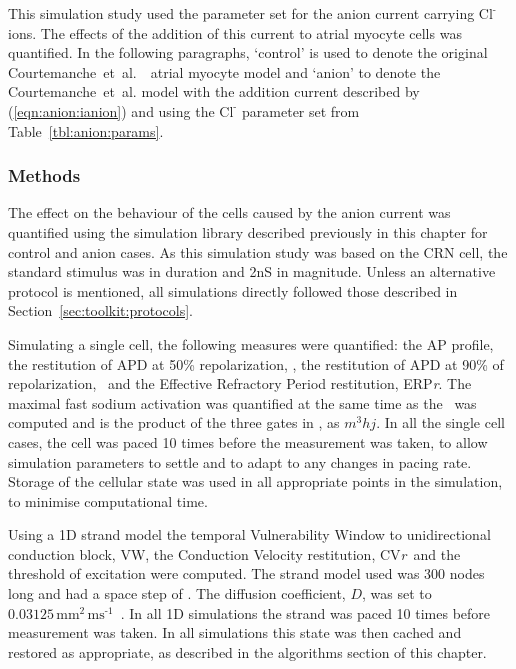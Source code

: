 This simulation study used the parameter set for the anion current carrying
$\text{Cl}^{\text{-}}$ ions.
The effects of the addition of this current to atrial myocyte cells was
quantified.
In the following paragraphs, `control' is used to denote the original
Courtemanche~et~al.~\cite{CRN98}\ atrial myocyte model and `anion' to denote the
Courtemanche~et~al. model with the addition current described by
(\ref{eqn:anion:ianion}) and using the $\text{Cl}^{\text{-}}$ parameter set from
Table~\ref{tbl:anion:params}.

\subsubsection{Methods}

The effect on the behaviour of the cells caused by the anion current was
quantified using the simulation library described previously in this chapter for
control and anion cases.
As this simulation study was based on the CRN cell, the standard stimulus was
 in duration and \unit{2}{nS} in magnitude.
Unless an alternative protocol is mentioned, all simulations directly followed
those described in Section~\ref{sec:toolkit:protocols}.

Simulating a single cell, the following measures were quantified: the AP
profile, the restitution of APD at 50\% repolarization, \apdr[50], the
restitution of APD at 90\% of repolarization, \apdr\ and the Effective
Refractory Period restitution, ERP\emph{r}.  The maximal fast sodium activation
was quantified at the same time as the \apdr\ was computed and is the product of
the three gates in , as $m^{3}hj$. In all the single cell cases, the
cell was paced 10 times before the measurement was taken, to allow simulation
parameters to settle and to adapt to any changes in pacing rate.  Storage of the
cellular state was used in all appropriate points in the simulation, to minimise
computational time.

Using a 1D strand model the temporal Vulnerability Window to unidirectional
conduction block, VW, the Conduction Velocity restitution, CV\emph{r}\ and the
threshold of excitation were computed.  The strand model used was 300 nodes long
and had a space step of .  The diffusion coefficient, $D$, was set to
$0.03125\,\text{mm}^{\text{2}}\,\text{ms}^{\text{-1}}$~\cite{Biktasheva2005}.
In all 1D simulations the strand was paced 10 times before measurement was
taken.  In all simulations this state was then cached and restored as
appropriate, as described in the algorithms section of this chapter.

